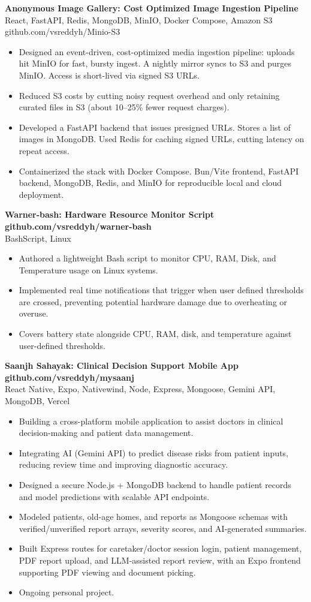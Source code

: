 \documentclass[a4paper,11pt]{article}
\newcommand{\resumeItem}[1]{\item \small{#1}}
\newcommand{\resumeSubheading}[4]{%
  \textbf{#1} \hfill \textbf{#2} \\
{#3} \hfill {#4}
}
\newcommand{\resumeSubHeadingListStart}{\begin{itemize}}
\newcommand{\resumeSubHeadingListEnd}{\end{itemize}}
\begin{document}
\resumeSubheading
{Anonymous Image Gallery: Cost Optimized Image Ingestion Pipeline}{}{React, FastAPI, Redis, MongoDB, MinIO, Docker Compose, Amazon S3}{github.com/vsreddyh/Minio-S3}
\resumeSubHeadingListStart
\resumeItem{Designed an event-driven, cost-optimized media ingestion pipeline: uploads hit MinIO for fast, bursty ingest. A nightly mirror syncs to S3 and purges MinIO. Access is short-lived via signed S3 URLs.}
\resumeItem{Reduced S3 costs by cutting noisy request overhead and only retaining curated files in S3 (about 10–25\% fewer request charges).}
\resumeItem{Developed a FastAPI backend that issues presigned URLs. Stores a list of images in MongoDB. Used Redis for caching signed URLs, cutting latency on repeat access.}
\resumeItem{Containerized the stack with Docker Compose. Bun/Vite frontend, FastAPI backend, MongoDB, Redis, and MinIO for reproducible local and cloud deployment.}
\resumeSubHeadingListEnd

\resumeSubheading
{Warner-bash: Hardware Resource Monitor Script}{github.com/vsreddyh/warner-bash}{BashScript, Linux}{}
\resumeSubHeadingListStart
\resumeItem{Authored a lightweight Bash script to monitor CPU, RAM, Disk, and Temperature usage on Linux systems.}
\resumeItem{Implemented real time notifications that trigger when user defined thresholds are crossed, preventing potential hardware damage due to overheating or overuse.}
\resumeItem{Covers battery state alongside CPU, RAM, disk, and temperature against user-defined thresholds.}
\resumeSubHeadingListEnd

\resumeSubheading
{Saanjh Sahayak: Clinical Decision Support Mobile App}{github.com/vsreddyh/mysaanj}{React Native, Expo, Nativewind, Node, Express, Mongoose, Gemini API, MongoDB, Vercel}{}
\resumeSubHeadingListStart
\resumeItem{Building a cross-platform mobile application to assist doctors in clinical decision-making and patient data management.}
\resumeItem{Integrating AI (Gemini API) to predict disease risks from patient inputs, reducing review time and improving diagnostic accuracy.}
\resumeItem{Designed a secure Node.js + MongoDB backend to handle patient records and model predictions with scalable API endpoints.}
\resumeItem{Modeled patients, old-age homes, and reports as Mongoose schemas with verified/unverified report arrays, severity scores, and AI-generated summaries.}
\resumeItem{Built Express routes for caretaker/doctor session login, patient management, PDF report upload, and LLM-assisted report review, with an Expo frontend supporting PDF viewing and document picking.}
\resumeItem{Ongoing personal project.}
\resumeSubHeadingListEnd
\end{document}
